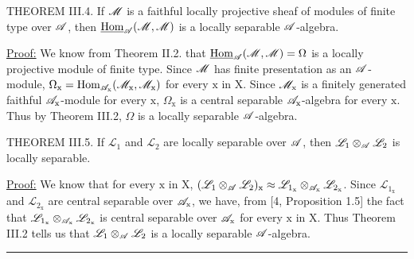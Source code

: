THEOREM III.4. If $\mathscr{M}$ is a faithful locally projective sheaf of modules of finite type over $\mathscr{A}$, then $\underline{\mathrm{Hom}}_{\mathscr{A}}(\mathscr{M},\mathscr{M})$ is a locally separable $\mathscr{A}$-algebra.

\uline{Proof:} We know from Theorem II.2. that $\underline{\mathrm{Hom}}_{\mathscr{A}}(\mathscr{M},\mathscr{M})=\Omega$ is a locally projective module of finite type. Since $\mathscr{M}$ has finite presentation as an $\mathscr{A}$-module, $\Omega_{\mathrm x}=\mathrm{Hom}_{\mathscr{A}_{\mathrm x}}(\mathscr{M}_{\mathrm x},\mathscr{M}_{\mathrm x})$ for every $\mathrm x$ in $\mathrm X$. Since $\mathscr{M}_{\mathrm x}$ is a finitely generated faithful $\mathscr{A}_{\mathrm x}$-module for every $\mathrm x$, $\Omega_{\mathrm x}$ is a central separable $\mathscr{A}_{\mathrm x}$-algebra for every $\mathrm x$. Thus by Theorem III.2, $\Omega$ is a locally separable $\mathscr{A}$-algebra.

THEOREM III.5. If $\mathscr{L}_1$ and $\mathscr{L}_2$ are locally separable over $\mathscr{A}$, then $\mathscr{L}_1\otimes_{\mathscr{A}}\mathscr{L}_2$ is locally separable.

\uline{Proof:} We know that for every $\mathrm x$ in $\mathrm X$, $(\mathscr{L}_1\otimes_{\mathscr{A}}\mathscr{L}_2)_{\mathrm x}\approx \mathscr{L}_{1_{\mathrm x}}\otimes_{\mathscr{A}_{\mathrm x}}\mathscr{L}_{2_{\mathrm x}}$. Since $\mathscr{L}_{1_{\mathrm x}}$ and $\mathscr{L}_{2_{\mathrm x}}$ are central separable over $\mathscr{A}_{\mathrm x}$, we have, from [4, Proposition 1.5] the fact that $\mathscr{L}_{1_{\mathrm x}}\otimes_{\mathscr{A}_{\mathrm x}}\mathscr{L}_{2_{\mathrm x}}$ is central separable over $\mathscr{A}_{\mathrm x}$ for every $\mathrm x$ in $\mathrm X$. Thus Theorem III.2 tells us that $\mathscr{L}_1\otimes_{\mathscr{A}}\mathscr{L}_2$ is a locally separable $\mathscr{A}$-algebra.

\begin{center}\rule{3cm}{0.4pt}\end{center}

